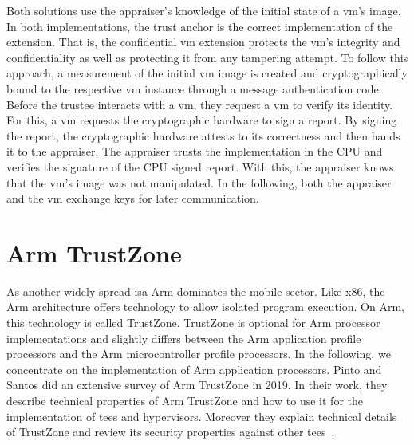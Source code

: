 Both solutions use the appraiser's knowledge of the initial state of a
\gls{vm}'s image. In both implementations, the trust anchor is the correct
implementation of the extension. That is, the confidential \gls{vm} extension
protects the \gls{vm}'s integrity and confidentiality as well as protecting it
from any tampering attempt. To follow this approach, a measurement of the initial
\gls{vm} image is created and cryptographically bound to the respective \gls{vm}
instance through a message authentication code. Before the trustee interacts
with a \gls{vm}, they request a \gls{vm} to verify its identity. For this, a
\gls{vm} requests the cryptographic hardware to sign a report. By signing the
report, the cryptographic hardware attests to its correctness and then hands it
to the appraiser. The appraiser trusts the implementation in the CPU and
verifies the signature of the CPU signed report. With this, the appraiser knows
that the \gls{vm}'s image was not manipulated. In the following, both the
appraiser and the \gls{vm} exchange keys for later communication.\\

\section{Arm TrustZone}
\label{sec:20:trustzone}
As another widely spread \gls{isa} Arm dominates the mobile sector. Like x86,
the Arm architecture offers technology to allow isolated program execution. On
Arm, this technology is called TrustZone. TrustZone is optional for Arm
processor implementations and slightly differs between the Arm application
profile processors and the Arm microcontroller profile processors. In the
following, we concentrate on the implementation of Arm application processors.
Pinto and Santos did an extensive survey of Arm TrustZone in 2019. In their
work, they describe technical properties of Arm TrustZone and how to use it for
the implementation of \glspl{tee} and hypervisors. Moreover they explain
technical details of TrustZone and review its security properties against other
\glspl{tee}~\cite{pinto_demystifying_2019}.\\

